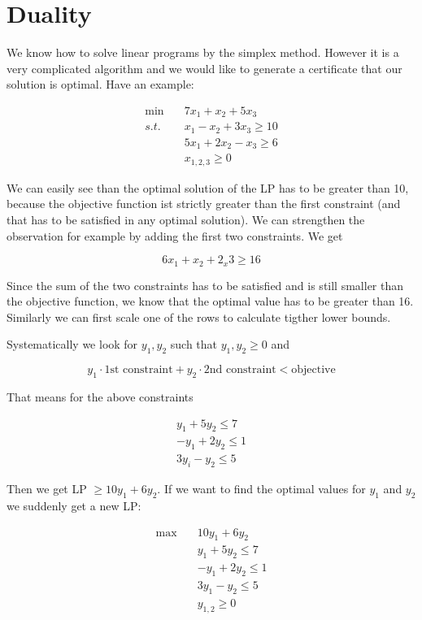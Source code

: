 \section{Duality}

We know how to solve linear programs by the simplex method. However it is a very complicated algorithm and we would like to generate a certificate that our solution is optimal. Have an example:

\begin{align*}
\min \quad & 7x_1+x_2+5x_3\\
s.t.\quad & x_1 -x_2 +3x_3 \geq 10\\
& 5x_1+2x_2-x_3 \geq 6\\
&x_{1,2,3} \geq 0
\end{align*}

We can easily see than the optimal solution of the LP has to be greater than 10, because the objective function ist strictly greater than the first constraint (and that has to be satisfied in any optimal solution). We can strengthen the observation for example by adding the first two constraints. We get

\[6x_1+x_2+2_x3\geq 16\]

Since the sum of the two constraints has to be satisfied and is still smaller than the objective function, we know that the optimal value has to be greater than 16. Similarly we can first scale one of the rows to calculate tigther lower bounds. 

Systematically we look for $y_1,y_2$ such that $y_1,y_2\geq 0$ and

\[y_1 \cdot \text{1st constraint} + y_2 \cdot \text{2nd constraint} < \text{objective}\]

That means for the above constraints

\begin{align*}
y_1+5y_2 \leq 7\\
-y_1 +2y_2 \leq 1\\
3y_i - y_2 \leq 5
\end{align*}

Then we get LP $\geq 10y_1 + 6y_2$. If we want to find the optimal values for $y_1$ and $y_2$ we suddenly get a new LP:

\begin{align*}
\max \quad & 10y_1 +6y_2\\
&y_1 + 5y_2 \leq 7\\
&-y_1+2y_2 \leq 1\\
&3y_1 -y_2 \leq 5\\
&y_{1,2} \geq 0
\end{align*}

